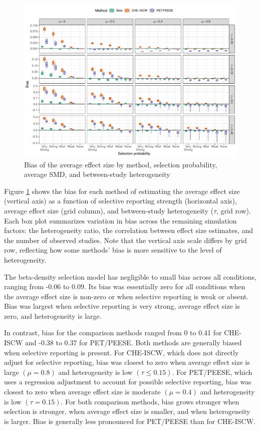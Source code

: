 \documentclass[
  american,
  man, donotrepeattitle,floatsintext]{apa7}
\begin{document}
\begin{figure}
\includegraphics{beta-function-selection-models-with-dependent-effects_files/figure-latex/mu-bias-main-1} \caption{Bias of the average effect size by method, selection probability, average SMD, and between-study heterogeneity}\label{fig:mu-bias-main}
\end{figure}

Figure \ref{fig:mu-bias-main} shows the bias for each method of estimating the average effect size (vertical axis) as a function of selective reporting strength (horizontal axis), average effect size (grid column), and between-study heterogeneity (\(\tau\), grid row). Each box plot summarizes variation in bias across the remaining simulation factors: the heterogeneity ratio, the correlation between effect size estimates, and the number of observed studies. Note that the vertical axis scale differs by grid row, reflecting how some methods' bias is more sensitive to the level of heterogeneity.

The beta-density selection model has negligible to small bias across all conditions, ranging from -0.06 to 0.09. Its bias was essentially zero for all conditions when the average effect size is non-zero or when selective reporting is weak or absent. Bias was largest when selective reporting is very strong, average effect size is zero, and heterogeneity is large.

In contrast, bias for the comparison methods ranged from 0 to 0.41 for CHE-ISCW and -0.38 to 0.37 for PET/PEESE. Both methods are generally biased when selective reporting is present.
For CHE-ISCW, which does not directly adjust for selective reporting, bias was closest to zero when average effect size is large \((\mu = 0.8)\) and heterogeneity is low \((\tau \leq 0.15)\).
For PET/PEESE, which uses a regression adjustment to account for possible selective reporting, bias was closest to zero when average effect size is moderate \((\mu = 0.4)\) and heterogeneity is low \((\tau = 0.15)\).
For both comparison methods, bias grows stronger when selection is stronger, when average effect size is smaller, and when heterogeneity is larger.
Bias is generally less pronounced for PET/PEESE than for CHE-ISCW.
\end{document}
